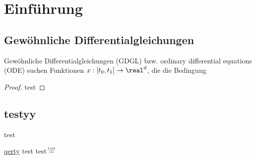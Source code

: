 \chapter*{Einführung}
\section{Gewöhnliche Differentialgleichungen}
Gewöhnliche Differentialgleichungen (GDGL) bzw. ordinary differential
equations (ODE) suchen Funktionen $x : [t_0, t_1] \to \real^d$, die die
Bedingung 

\begin{proof}
test
\end{proof}
\section{testyy}
\begin{alphlist}
\item test
\end{alphlist}
\ul{qerty}
test \enter test
$\stackeq{test}$
